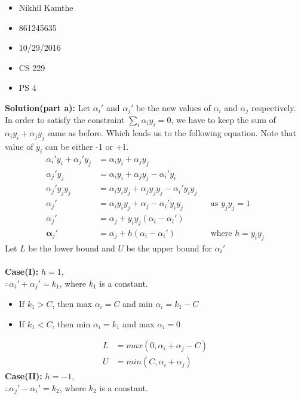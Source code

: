 \documentclass[10pt]{article}
\begin{document}
\begin{itemize}
	\item Nikhil Kamthe
	\item 861245635
	\item 10/29/2016
	\item CS 229
	\item PS 4
\end{itemize}
\hrulefill

\textbf{Solution(part a):} Let $\alpha_{i}'$ and $\alpha_{j}'$ be the new values of $\alpha_{i}$ and $\alpha_{j}$ respectively. In order to satisfy the constraint $\sum_{i}^{} \alpha_{i}y_{i} = 0$, we have to keep the sum of $\alpha_{i}y_{i} + \alpha_{j}y_{j}$ same as before. Which leads us to the following equation. Note that value of $y_{i}$ can be either -1 or +1.
\begin{align*}
\alpha_{i}'y_{i} + \alpha_{j}'y_{j} &= \alpha_{i}y_{i} + \alpha_{j}y_{j}\\
\alpha_{j}'y_{j} &= \alpha_{i}y_{i} + \alpha_{j}y_{j} - \alpha_{i}'y_{i}\\
\alpha_{j}'y_{j}y_{j} &= \alpha_{i}y_{i}y_{j} + \alpha_{j}y_{j}y_{j} - \alpha_{i}'y_{i}y_{j}\\
\alpha_{j}' &= \alpha_{i}y_{i}y_{j} + \alpha_{j} - \alpha_{i}'y_{i}y_{j} && \text{as } y_{j}y_{j} = 1\\
\alpha_{j}' &= \alpha_{j} + y_{i}y_{j} (\alpha_{i} - \alpha_{i}')\\
\mathbf\alpha_{j}' &= \alpha_{j} + h (\alpha_{i} - \alpha_{i}') && \text{where } h = y_{i}y_{j}
\end{align*}
Let $L$ be the lower bound and $U$ be the upper bound for $\alpha_{i}'$\\\\
\textbf{Case(I):} $h = 1$,\\
$\therefore \alpha_{i}' + \alpha_{j}' = k_{1}$, where $k_{1}$ is a constant.
\begin{itemize}
	\item If $k_{1} > C$, then max $\alpha_{i} = C$ and min $ \alpha_{i} = k_{1}-C$
	\item If $k_{1} < C$, then min $\alpha_{i} = k_{1}$ and max $ \alpha_{i} = 0$
\end{itemize}
\begin{align*}
L &= max(0,\alpha_{i}+\alpha_{j}-C)\\
U &= min(C,\alpha_{i}+\alpha_{j})
\end{align*}
\textbf{Case(II):} $h = -1$,\\
$\therefore \alpha_{j}' - \alpha_{i}' = k_{2}$, where $k_{2}$ is a constant.
\end{document}

